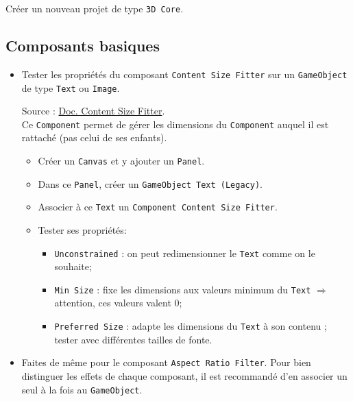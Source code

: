 \documentclass[a4paper,10pt]{article}
\newenvironment{solution}%
{\begin{tcolorbox}[breakable,colback=red!5!white,colframe=red!75!black,title=Solution]}%
{\end{tcolorbox}}
\begin{document}
\ifversionenseignant
\begin{solution}
Créer un nouveau projet de type \texttt{3D Core}.
	
\end{solution}
\fi 

\subsection*{Composants basiques}

\begin{itemize}
	  \item Tester les propriétés du  composant \texttt{Content Size Fitter} sur un \texttt{GameObject} de type \texttt{Text} ou \texttt{Image}.
	  
\ifversionenseignant
\begin{solution}
Source : \href{https://docs.unity3d.com/Packages/com.unity.ugui@1.0/manual/script-ContentSizeFitter.html}{Doc. Content Size Fitter}.\\

Ce \texttt{Component} permet de gérer les dimensions du \texttt{Component} auquel il est rattaché (pas celui de ses enfants).

\begin{itemize}
	\item Créer un \texttt{Canvas} et y ajouter un \texttt{Panel}.
	\item Dans ce \texttt{Panel}, créer un \texttt{GameObject Text (Legacy)}.
	\item Associer à ce \texttt{Text} un \texttt{Component Content Size Fitter}.
	\item Tester ses propriétés:
	\begin{itemize}
		\item 	\texttt{Unconstrained} : on peut redimensionner le \texttt{Text} comme on le souhaite;
		\item \texttt{Min Size} : fixe les dimensions aux valeurs minimum du \texttt{Text} $\Rightarrow$ attention, ces valeurs valent 0;
		\item \texttt{Preferred Size} : adapte les dimensions du \texttt{Text} à son contenu ; tester avec différentes tailles de fonte.		
	\end{itemize}	
\end{itemize}

\end{solution}
\fi 
	  
	  \item Faites de même pour le composant \texttt{Aspect Ratio Filter}. Pour bien distinguer les effets de chaque composant, il est recommandé d'en associer un seul à la fois au \texttt{GameObject}.
	  

\end{itemize}
\end{document}

